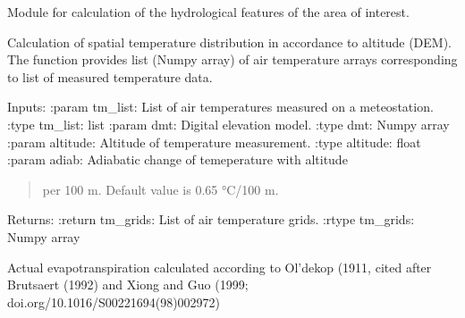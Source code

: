 \documentclass[letterpaper,10pt,english]{sphinxmanual}
\begin{document}
\begin{fulllineitems}
\label{\detokenize{libs:waterflow.WaterBalance}}
Module for calculation of the hydrological features of the area of
interest.

\begin{fulllineitems}
\label{\detokenize{libs:waterflow.WaterBalance.airTemperToGrid}}
Calculation of spatial temperature distribution in accordance
to altitude (DEM). The function provides list (Numpy array) of air
temperature arrays corresponding to list of measured temperature
data.

Inputs:
:param tm\_list: List of air temperatures measured on a meteostation.
:type tm\_list: list
:param dmt: Digital elevation model.
:type dmt: Numpy array
:param altitude: Altitude of temperature measurement.
:type altitude: float
:param adiab: Adiabatic change of temeperature with altitude
\begin{quote}

per 100 m. Default value is 0.65 °C/100 m.
\end{quote}
\begin{quote}\begin{description}
\end{description}\end{quote}

Returns:
:return tm\_grids: List of air temperature grids.
:rtype tm\_grids: Numpy array

\end{fulllineitems}


\begin{fulllineitems}
\label{\detokenize{libs:waterflow.WaterBalance.evapoActual}}
Actual evapotranspiration calculated according to Ol’dekop (1911,
cited after Brutsaert (1992) and Xiong and Guo 
(1999; doi.org/10.1016/S0022\sphinxhyphen{}1694(98)00297\sphinxhyphen{}2)


\end{fulllineitems}
\end{fulllineitems}
\end{document}
